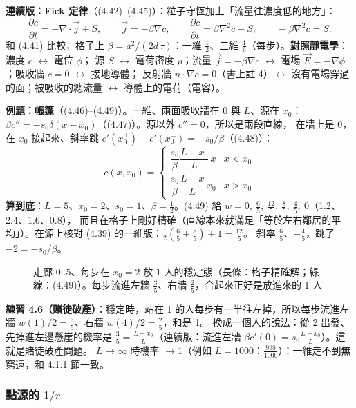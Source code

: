 \textbf{連續版：Fick 定律}（(4.42)--(4.45)）：粒子守恆加上「流量往濃度低的地方」：
\[\frac{\partial c}{\partial t}=-\nabla\cdot\vec j+S,\qquad \vec j=-\beta\nabla c,\qquad \frac{\partial c}{\partial t}=\beta\nabla^2c+S,\qquad -\beta\nabla^2c=S.\tag{4.42--4.45}\]
和 (4.41) 比較，格子上 $\beta=a^2/(2d\,\tau)$：一維 $\frac12$、三維 $\frac16$（每步）。\textbf{對照靜電學}：濃度 $c$ $\leftrightarrow$ 電位 $\phi$；
源 $S$ $\leftrightarrow$ 電荷密度 $\rho$；流量 $\vec j=-\beta\nabla c$ $\leftrightarrow$ 電場 $\vec E=-\nabla\phi$；吸收牆 $c=0$ $\leftrightarrow$ 接地導體；
反射牆 $\hat n\cdot\nabla c=0$（書上註 4）$\leftrightarrow$ 沒有電場穿過的面；被吸收的總流量 $\leftrightarrow$ 導體上的電荷（電容）。

\textbf{例題：帳篷}（(4.46)--(4.49)）。一維、兩面吸收牆在 $0$ 與 $L$、源在 $x_0$：$\beta c''=-s_0\delta(x-x_0)$（(4.47)）。源以外 $c''=0$，所以是兩段直線，
在牆上是 0，在 $x_0$ 接起來、斜率跳 $c'(x_0^+)-c'(x_0^-)=-s_0/\beta$（(4.48)）：
\[c(x,x_0)=\begin{cases}\dfrac{s_0}{\beta}\dfrac{L-x_0}{L}\,x & x<x_0\\[2mm] \dfrac{s_0}{\beta}\dfrac{L-x}{L}\,x_0 & x>x_0\end{cases}\tag{4.49}\]
\textbf{算到底}：$L=5$、$x_0=2$、$s_0=1$、$\beta=\frac12$。(4.49) 給 $w=0,\ \frac65,\ \frac{12}5,\ \frac85,\ \frac45,\ 0$（1.2、2.4、1.6、0.8），
而且在格子上剛好精確（直線本來就滿足「等於左右鄰居的平均」）。在源上核對 (4.39) 的一維版：$\frac12(\frac65+\frac85)+1=\frac{12}5$。
斜率 $\frac65$、$-\frac45$，跳了 $-2=-s_0/\beta$。
\begin{figure}[H]
\centering
\FourFigTent
\caption{走廊 $0..5$、每步在 $x_0=2$ 放 1 人的穩定態（長條：格子精確解；綠線：(4.49)）。每步流進左牆 $\frac35$、右牆 $\frac25$，合起來正好是放進來的 1 人}\label{four-fig-tent}
\end{figure}

\textbf{練習 4.6（賭徒破產）}：穩定時，站在 1 的人每步有一半往左掉，所以每步流進左牆 $w(1)/2=\frac35$、右牆 $w(4)/2=\frac25$，和是 1。
換成一個人的說法：從 2 出發、先掉進左邊懸崖的機率是 $\frac35=\frac{L-x_0}{L}$（連續版：流進左牆 $\beta c'(0)=s_0\frac{L-x_0}{L}$）。這就是賭徒破產問題。
$L\to\infty$ 時機率 $\to1$（例如 $L=1000$：$\frac{998}{1000}$）：一維走不到無窮遠，和 4.1.1 節一致。

\subsubsection{\texorpdfstring{點源的 $1/r$}{點源的 1/r}}
\ 

